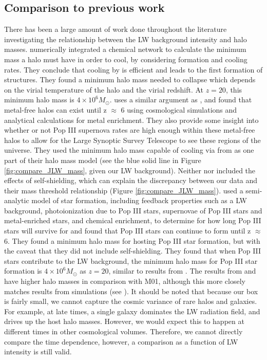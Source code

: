 \documentclass[a4paper,fleqn,usenatbib]{mnras}
\begin{document}
\subsection{Comparison to previous work}

There has been a large amount of work done throughout the literature investigating the relationship between the LW background intensity and halo masses. \citet{Tegmark97} numerically integrated a chemical network to calculate the minimum mass a halo must have in order to cool, by considering \hh{} formation and cooling rates. They conclude that cooling by \hh{} is efficient and leads to the first formation of structures. They found a minimum halo mass needed to collapse which depends on the virial temperature of the halo and the virial redshift. At $z = 20$, this minimum halo mass is $4 \times 10^{6} M_{\odot}$. \citet{Trenti09} uses a similar argument as \citet{Tegmark97}, and found that metal-free halos can exist until z $\approx$ 6 using cosmological simulations and analytical calculations for metal enrichment. They also provide some insight into whether or not Pop III supernova rates are high enough within these metal-free halos to allow for the Large Synoptic Survey Telescope to see these regions of the universe. They used the minimum halo mass capable of cooling via \hh{} from \citet{Trenti09_SFR} as one part of their halo mass model (see the blue solid line in Figure \ref{fig:compare_JLW_mass}, given our LW background). Neither \citet{Trenti09} nor \citet{Tegmark97} included the effects of \hh{} self-shielding, which can explain the discrepancy between our data and their mass threshold relationship (Figure \ref{fig:compare_JLW_mass}). \citet{Mebane18} used a semi-analytic model of star formation, including feedback properties such as a LW background, photoionization due to Pop III stars, supernovae of Pop III stars and metal-enriched stars, and chemical enrichment, to determine for how long Pop III stars will survive for and found that Pop III stars can continue to form until z $\approx$ 6. They found a minimum halo mass for hosting Pop III star formation, but with the caveat that they did not include \hh{} self-shielding. They found that when Pop III stars contribute to the LW background, the minimum halo mass for Pop III star formation is $4 \times 10^{6} M_{\odot}$ as $z = 20$, similar to results from \citet{Tegmark97}. The results from \citet{Trenti09} and \citet{Mebane18} have higher halo masses in comparison with M01, although this more closely matches results from simulations (see \citet{Wise07_UVB, OShea08}). It should be noted that because our box is fairly small, we cannot capture the cosmic variance of rare halos and galaxies. For example, at late times, a single galaxy dominates the LW radiation field, and drives up the host halo masses. However, we would expect this to happen at different times in other cosmological volumes. Therefore, we cannot directly compare the time dependence, however, a comparison as a function of LW intensity is still valid. 
\end{document}
